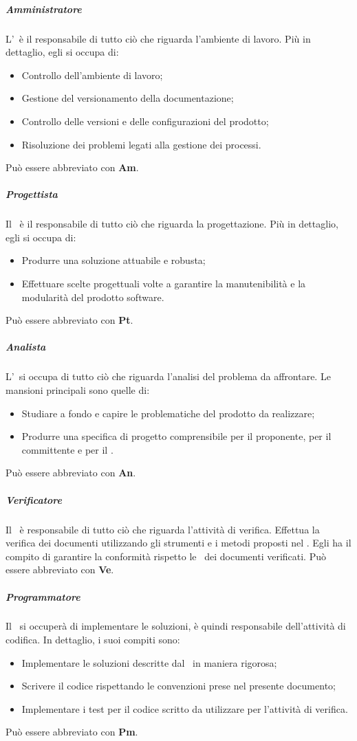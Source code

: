\documentclass[../NormeDiProgetto_v3.0.0.tex]{subfiles}
\begin{document}
			\subparagraph{Amministratore}
			L'\amministratore\ è il responsabile di tutto ciò che riguarda l'ambiente di lavoro. Più in dettaglio, egli si occupa di:
			\begin{itemize}
			\item Controllo dell'ambiente di lavoro;
			\item Gestione del versionamento della documentazione;
			\item Controllo delle versioni e delle configurazioni del prodotto;
			\item Risoluzione dei problemi legati alla gestione dei processi.
			\end{itemize}
			Può essere abbreviato con \textbf{Am}.
			
			\subparagraph{Progettista}
			Il \progettista\ è il responsabile di tutto ciò che riguarda la progettazione.
			Più in dettaglio, egli si occupa di:
			\begin{itemize}
			\item Produrre una soluzione attuabile e robusta;
			\item Effettuare scelte progettuali volte a garantire la manutenibilità e la modularità del prodotto software.
			\end{itemize}
			Può essere abbreviato con \textbf{Pt}.
			
			\subparagraph{Analista}
			L'\analista\ si occupa di tutto ciò che riguarda l'analisi del problema da affrontare. Le mansioni principali sono quelle di:
			\begin{itemize}
			\item Studiare a fondo e capire le problematiche del prodotto da realizzare;
			\item Produrre una specifica di progetto comprensibile per il proponente, per il committente e per il \progettista.
			\end{itemize}
			Può essere abbreviato con \textbf{An}.
			
			\subparagraph{Verificatore}
			Il \verificatore\ è responsabile di tutto ciò che riguarda l'attività di verifica.
			Effettua la verifica dei documenti utilizzando gli strumenti e i metodi proposti nel
			\pianodiqualifica.
			Egli ha il compito di garantire la conformità rispetto le \normediprogetto\ dei documenti verificati.
			Può essere abbreviato con \textbf{Ve}.
			
			\subparagraph{Programmatore}
			Il \programmatore\ si occuperà di implementare le soluzioni, è quindi
			responsabile dell'attività di codifica. In dettaglio, i suoi compiti sono:
			\begin{itemize}
			\item Implementare le soluzioni descritte dal \progettista\ in maniera
			rigorosa;
			\item Scrivere il codice rispettando le convenzioni prese nel presente documento;
			\item Implementare i test per il codice scritto da utilizzare per l'attività di verifica.
			\end{itemize}
			Può essere abbreviato con \textbf{Pm}.
	
\end{document}
